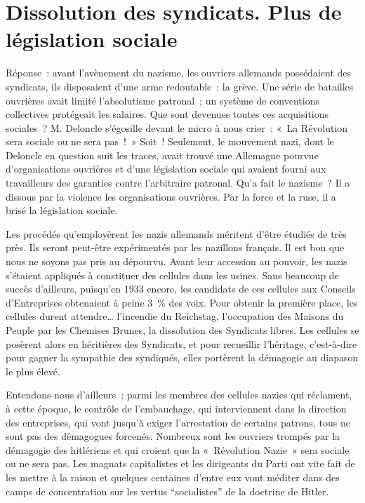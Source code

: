 \documentclass[french,twoside]{book} %
\begin{document}
\section[{Dissolution des syndicats. Plus de législation sociale}]{Dissolution des syndicats. Plus de législation sociale}
\noindent Réponse : avant l’avènement du nazisme, les ouvriers allemands possédaient des syndicats, ils disposaient d’une arme redoutable : la grève. Une série de batailles ouvrières avait limité l’absolutisme patronal ; un système de conventions collectives protégeait les salaires. Que sont devenues toutes ces acquisitions sociales ? M. Deloncle s’égosille devant le micro à nous crier : « La Révolution sera sociale ou ne sera pas ! » Soit ! Seulement, le mouvement nazi, dont le Deloncle en question suit les traces, avait trouvé une Allemagne pourvue d’organisations ouvrières et d’une législation sociale qui avaient fourni aux travailleurs des garanties contre l’arbitraire patronal. Qu’a fait le nazisme ? Il a dissous par la violence les organisations ouvrières. Par la force et la ruse, il a brisé la législation sociale.\par
Les procédés qu’employèrent les nazis allemands méritent d’être étudiés de très près. Ils seront peut-être expérimentés par les nazillons français. Il est bon que nous ne soyons pas pris au dépourvu. Avant leur accession au pouvoir, les nazis s’étaient appliqués à constituer des cellules dans les usines. Sans beaucoup de succès d’ailleurs, puisqu’en 1933 encore, les candidats de ces cellules aux Conseils d’Entreprises obtenaient à peine 3 \% des voix. Pour obtenir la première place, les cellules durent attendre… l’incendie du Reichstag, l’occupation des Maisons du Peuple par les Chemises Brunes, la dissolution des Syndicats libres. Les cellules se posèrent alors en héritières des Syndicats, et pour recueillir l’héritage, c’est-à-dire pour gagner la sympathie des syndiqués, elles portèrent la démagogie au diapason le plus élevé.\par
Entendons-nous d’ailleurs ; parmi les membres des cellules nazies qui réclament, à cette époque, le contrôle de l’embauchage, qui interviennent dans la direction des entreprises, qui vont jusqu’à exiger l’arrestation de certains patrons, tous ne sont pas des démagogues forcenés. Nombreux sont les ouvriers trompés par la démagogie des hitlériens et qui croient que la « Révolution Nazie » sera sociale ou ne sera pas. Les magnats capitalistes et les dirigeants du Parti ont vite fait de les mettre à la raison et quelques centaines d’entre eux vont méditer dans des camps de concentration sur les vertus “socialistes” de la doctrine de Hitler.
\end{document}
